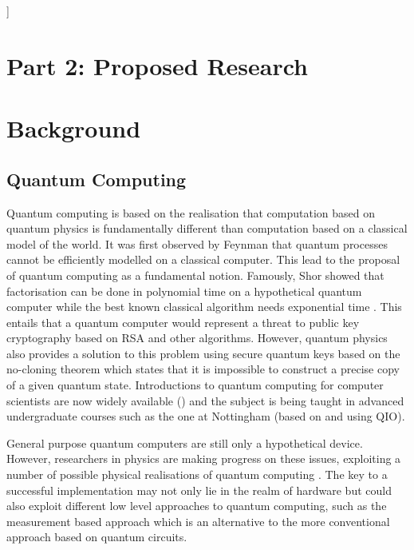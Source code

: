 \documentclass[a4paper]{article}
\begin{document}
\vspace{1em}
]




{\small 
{}
}


\newpage

\section*{Part 2: Proposed Research}

\section{Background}

\subsection*{Quantum Computing}
Quantum computing is based on the realisation that computation based
on quantum physics is fundamentally different than computation based
on a classical model of the world. It was first observed by Feynman 
that quantum processes cannot be efficiently modelled on a classical
computer. This lead to the proposal of quantum computing as a
fundamental notion. Famously, Shor showed that factorisation can be
done in polynomial time on a hypothetical quantum computer
 while the
best known classical algorithm needs exponential time
. This entails
that a quantum computer would represent a threat to public key
cryptography based on RSA  and other algorithms. However, quantum
physics also provides a solution to this problem using secure quantum
keys based on the no-cloning theorem which states that it is
impossible to construct a precise copy of a given quantum
state. Introductions to quantum computing for computer scientists are
now widely available () and the
subject is being taught in advanced undergraduate courses
such as the one at Nottingham (based on  and using QIO). 

General purpose quantum computers are still only a hypothetical
device. However, researchers in physics are making progress on these
issues, exploiting a number of possible physical realisations of quantum
computing . The key to a successful
implementation may not only lie in the realm of hardware but could
also exploit different low level approaches to quantum computing, such
as the measurement based approach  
which is an alternative to the more
conventional approach based on quantum circuits.
\end{document}
